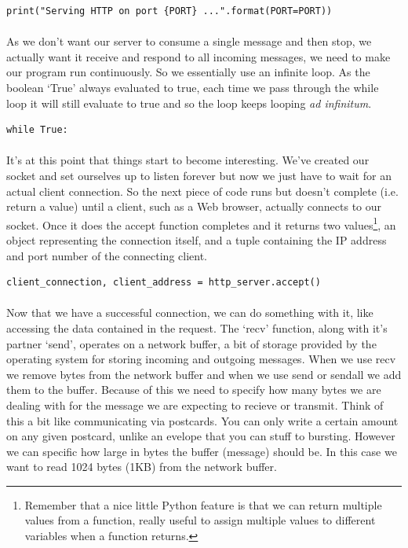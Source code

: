 \begin{lstlisting}[style=CODE]
print("Serving HTTP on port {PORT} ...".format(PORT=PORT))
\end{lstlisting}

\paragraph{} As we don't want our server to consume a single message and then stop, we actually want it receive and respond to all incoming messages, we need to make our program run continuously. So we essentially use an infinite loop. As the boolean `True' always evaluated to true, each time we pass through the while loop it will still evaluate to true and so the loop keeps looping \emph{ad infinitum}.

\begin{lstlisting}[style=CODE]
while True:
\end{lstlisting}

\paragraph{} It's at this point that things start to become interesting. We've created our socket and set ourselves up to listen forever but now we just have to wait for an actual client connection. So the next piece of code runs but doesn't complete (i.e. return a value) until a client, such as a Web browser, actually connects to our socket. Once it does the accept function completes and it returns two values\footnote{Remember that a nice little Python feature is that we can return multiple values from a function, really useful to assign multiple values to different variables when a function returns.}, an object representing the connection itself, and a tuple containing the IP address and port number of the connecting client.

\begin{lstlisting}[style=CODE]
client_connection, client_address = http_server.accept()
\end{lstlisting}

\paragraph{} Now that we have a successful connection, we can do something with it, like accessing the data contained in the request. The `recv' function, along with it's partner `send', operates on a network buffer, a bit of storage provided by the operating system for storing incoming and outgoing messages. When we use recv we remove bytes from the network buffer and when we use send or sendall we add them to the buffer. Because of this we need to specify how many bytes we are dealing with for the message we are expecting to recieve or transmit. Think of this a bit like communicating via postcards. You can only write a certain amount on any given postcard, unlike an evelope that you can stuff to bursting. However we can specific how large in bytes the buffer (message) should be. In this case we want to read 1024 bytes (1KB) from the network buffer.

